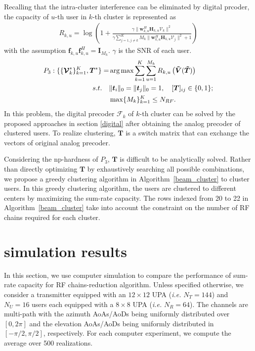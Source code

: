 \documentclass[conference]{IEEEtran}
\def\argmax{\mathop{\mbox{arg\,max}}}
\begin{document}
{Recalling that the intra-cluster interference can be eliminated by digital prcoder, the capacity of $u$-th user in $k$-th cluster is represented as
\begin{align}\label{capacity}
R_{k,u} = \log\left(1+\frac{\gamma\|\bm{w}^H_{k,u} \bm{H}_{k,u} \bm{\mathcal{V}}_{k}\|^2}{\gamma\sum_{j=1,j\neq k}^{K}M_k\|{\bm{w}}^H_{k,u} \bm{H}_{k,u} {\bm{\mathcal{V}}}_j\|^2+1}\right)
\end{align}
with the assumption $\bm{f}_{k,u}\bm{f}_{k,u}^H = \bm{I}_{M_k}$. $\gamma$ is the SNR of each user.
\begin{align}
P_3: \{\{\bm{\mathcal{V}}^*_k\}_{k=1}^{K}, \bm{T}^*\}=& \argmax \sum_{k=1}^{K}\sum_{u=1}^{M_k} R_{k,u}\left(\bm{\tilde{V}}(\bm{\tilde{T}})\right)\\
s.t. \quad &\|\bm{t}_{i}\|_0=\|\bm{t}_{j}\|_0=1, \quad [\bm{T}]_{ij}\in\{0,1\}; \nonumber \\
& \max \{M_k\}_{k=1}^K \leq N_{RF}.\nonumber
\end{align}
In this problem, the digital precoder $\bm{\mathcal{F}}_k$ of $k$-th cluster can be solved by the proposed approaches in section \ref{digital} after obtaining the analog precoder of clustered users. To realize clustering, $\bm{T}$ is a switch matrix that can exchange the vectors of original analog precoder.

Considering the np-hardness of $P_3$, $\bm{T}$ is difficult to be analytically solved. Rather than directly optimizing $\bm{T}$ by exhaustively searching all possible combinations, we propose a greedy clustering algorithm in Algorithm~\ref{beam_cluster} to cluster users. In this greedy clustering algorithm,  the users are clustered to different centers by maximizing the sum-rate capacity. The rows indexed from 20 to 22 in Algorithm~\ref{beam_cluster} take into account the constraint on the number of RF chains required for each cluster.




\section{simulation results}
In this section, we use computer simulation to compare the performance of sum-rate capacity for RF chains-reduction algorithm. Unless specified otherwise, we consider a transmitter equipped with an $12\times 12$ UPA ({\em i.e.} $N_T=144$) and $N_U=16$ users each equipped with a $8\times 8$ UPA ({\em i.e.} $N_R=64$). The channels are multi-path with the azimuth AoAs/AoDs being uniformly distributed over $[0, 2\pi]$ and the elevation AoAs/AoDs being uniformly distributed in $[-\pi/2, \pi/2]$, respectively. For each computer experiment, we compute the average over 500 realizations.

}
\end{document}
